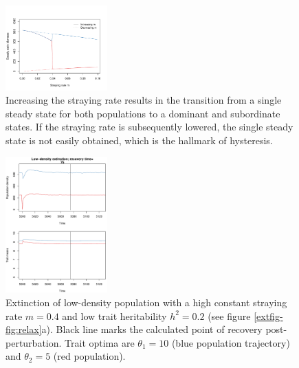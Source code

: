 \documentclass{revtex4}
\begin{document}
\begin{figure}
  \captionsetup{justification=raggedright,
singlelinecheck=false
}
\centering
\includegraphics[width=0.35\textwidth]{fig_hysteresis.pdf}
\caption{
Increasing the straying rate results in the transition from a single steady state for both populations to a dominant and subordinate states. If the straying rate is subsequently lowered, the single steady state is not easily obtained, which is the hallmark of hysteresis.
} \label{fig:hysteresis}
\end{figure}




\begin{figure}
  \captionsetup{justification=raggedright,
singlelinecheck=false
}
\centering
\includegraphics[width=0.35\textwidth]{fig_relax_small.pdf}
\caption{
Extinction of low-density population with a high constant straying rate $m=0.4$ and low trait heritability $h^2=0.2$ (see figure \ref{extfig-fig:relax}a).
Black line marks the calculated point of recovery post-perturbation.
Trait optima are $\theta_1 = 10$ (blue population trajectory) and $\theta_2 = 5$ (red population).
} \label{fig:relaxtraj_ldlh}
\end{figure}
\end{document}
